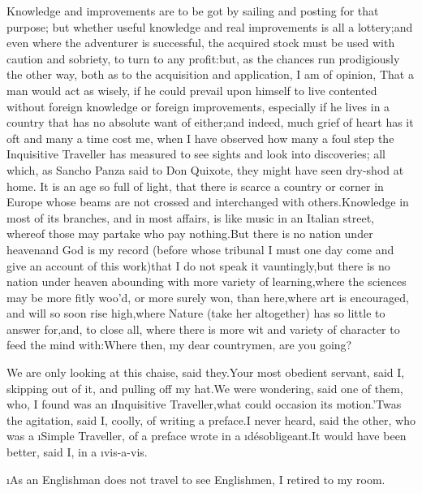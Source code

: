 \documentclass[twoside]{article}
\begin{document}
Knowledge and improvements are to be got by sailing and posting for that
purpose; but whether useful knowledge and real improvements is all a
lottery;\tsk and even where the adventurer is successful, the acquired stock
must be used with caution and sobriety, to turn to any profit:\tsk but, as
the chances run prodigiously the other way, both as to the acquisition
and application, I am of opinion, That a man would act as wisely, if he
could prevail upon himself to live contented without foreign knowledge or
foreign improvements, especially if he lives in a country that has no
absolute want of either;\tsk and indeed, much grief of heart has it oft and
many a time cost me, when I have observed how many a foul step the
Inquisitive Traveller has measured to see sights and look into
discoveries; all which, as Sancho Panza said to Don Quixote, they might
have seen dry-shod at home.  It is an age so full of light, that there is
scarce a country or corner in Europe whose beams are not crossed and
interchanged with others.\tsk Knowledge in most of its branches, and in most
affairs, is like music in an Italian street, whereof those may partake
who pay nothing.\tsk But there is no nation under heaven\tsk and God is my record
(before whose tribunal I must one day come and give an account of this
work)\tsk that I do not speak it vauntingly,\tsk but there is no nation under
heaven abounding with more variety of learning,\tsk where the sciences may be
more fitly woo’d, or more surely won, than here,\tsk where art is encouraged,
and will so soon rise high,\tsk where Nature (take her altogether) has so
little to answer for,\tsk and, to close all, where there is more wit and
variety of character to feed the mind with:\tsk Where then, my dear
countrymen, are you going?\tsk 

We are only looking at this chaise, said they.\tsk Your most obedient
servant, said I, skipping out of it, and pulling off my hat.\tsk We were
wondering, said one of them, who, I found was an \i{Inquisitive
Traveller},\tsk what could occasion its motion.\tsk ’Twas the agitation, said I,
coolly, of writing a preface.\tsk I never heard, said the other, who was a
\i{Simple Traveller}, of a preface wrote in a \i{désobligeant}.\tsk It would have
been better, said I, in a \i{vis-a-vis}.

\tsk \i{As an Englishman does not travel to see Englishmen}, I retired to my
room.




\end{document}
